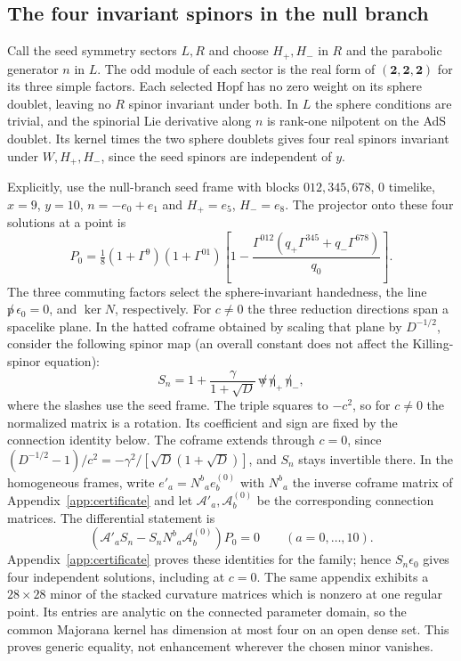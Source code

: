 \subsection{The four invariant spinors in the null branch}
Call the seed symmetry sectors $L,R$ and choose $H_+,H_-$ in $R$ and the
parabolic generator $n$ in $L$. The odd module of each sector is the real
form of $(\mathbf 2,\mathbf 2,\mathbf 2)$ for its three simple factors.
Each selected Hopf has no zero weight on its sphere doublet, leaving no
$R$ spinor invariant under both. In $L$ the sphere conditions are trivial,
and the spinorial Lie derivative along $n$ is rank-one nilpotent on the
AdS doublet. Its kernel times the two sphere doublets gives four real
spinors invariant under $W,H_+,H_-$, since the seed spinors are independent
of $y$.

Explicitly, use the null-branch seed frame with blocks $012,345,678$,
$0$ timelike, $x=9$, $y=10$, $n=-e_0+e_1$ and $H_+=e_5$, $H_-=e_8$.
The projector onto these four solutions at a point is
\begin{equation}\label{eq:spin-null-projector}
 P_0=\tfrac18(1+\Gamma^9)(1+\Gamma^{01})
 \left[1-\frac{\Gamma^{012}(q_+\Gamma^{345}+q_-\Gamma^{678})}{q_0}\right].
\end{equation}
The three commuting factors select the sphere-invariant handedness, the
line $\not p\,\epsilon_0=0$, and $\ker N$, respectively. For $c\ne0$ the
three reduction directions span a spacelike plane. In the hatted coframe
obtained by scaling that plane by $D^{-1/2}$, consider the following
spinor map (an overall constant does not affect the Killing-spinor equation):
\begin{equation}\label{eq:spin-null-rotation}
 S_n=1+\frac{\gamma}{1+\sqrt D}\,\not w\,\not\eta_+\,\not\eta_- ,
\end{equation}
where the slashes use the seed frame. The triple squares to $-c^2$, so for $c\ne0$ the normalized matrix is a rotation. Its coefficient and sign are fixed by the connection identity below. The coframe
extends through $c=0$, since $(D^{-1/2}-1)/c^2=-\gamma^2/[\sqrt D(1+
\sqrt D)]$, and $S_n$ stays invertible there. In the homogeneous frames,
write $e'_a=N^b{}_a e_b^{(0)}$ with $N^b{}_a$ the inverse coframe matrix of Appendix~\ref{app:certificate} and let $\mathcal A'_a,\mathcal A_b^{(0)}$
be the corresponding connection matrices. The differential statement is
\[
 (\mathcal A'_a S_n-S_n N^b{}_a\mathcal A_b^{(0)})P_0=0
 \qquad (a=0,\ldots,10).
\]
Appendix~\ref{app:certificate} proves these identities for the family;
hence $S_n\epsilon_0$ gives four independent solutions, including at $c=0$.
The same appendix exhibits a $28\times28$ minor of the stacked curvature
matrices which is nonzero at one regular point. Its entries are analytic
on the connected parameter domain, so the common Majorana kernel has
dimension at most four on an open dense set. This proves generic equality,
not enhancement wherever the chosen minor vanishes.

